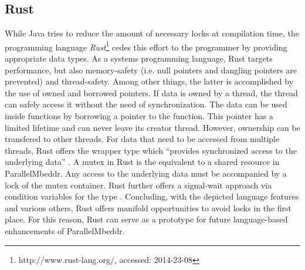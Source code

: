 \subsection{Rust}
While Java tries to reduce the amount of necessary locks at compilation time, the programming language \textit{Rust}\footnote{http://www.rust-lang.org/, accessed: 2014-23-08} cedes this effort to the programmer by providing appropriate data types. As a systems programming language, Rust targets performance, but also memory-safety (i.e. null pointers and dangling pointers are prevented) and thread-safety. Among other things, the latter is accomplished by the use of owned and borrowed pointers. If data is owned by a thread, the thread can safely access it without the need of synchronization. The data can be used inside functions by borrowing a pointer to the function. This pointer has a limited lifetime and can never leave its creator thread. However, ownership can be transfered to other threads. For data that need to be accessed from multiple threads, Rust offers the wrapper type  which ``provides synchronized access to the underlying data'' \cite{RustDocumentation}. A mutex in Rust is the equivalent to a shared resource in ParallelMbeddr. Any access to the underlying data must be accompanied by a lock of the mutex container. Rust further offers a signal-wait approach via condition variables for the type . Concluding, with the depicted language features and various others, Rust offers manifold opportunities to avoid locks in the first place. For this reason, Rust can serve as a prototype for future language-based enhancements of ParallelMbeddr.